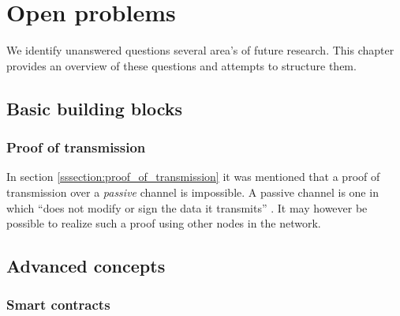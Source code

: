 \chapter{Open problems}
We identify unanswered questions several area's of future research. 
This chapter provides an overview of these questions and attempts to structure them.

\section{Basic building blocks}
\subsection{Proof of transmission}
In section \ref{sssection:proof_of_transmission} it was mentioned that a proof of transmission over a \emph{passive} channel is impossible. 
A passive channel is one in which ``does not modify or sign the data it transmits'' \cite{kravchenko}. 
It may however be possible to realize such a proof using other nodes in the network.

\section{Advanced concepts}
\subsection{Smart contracts}
